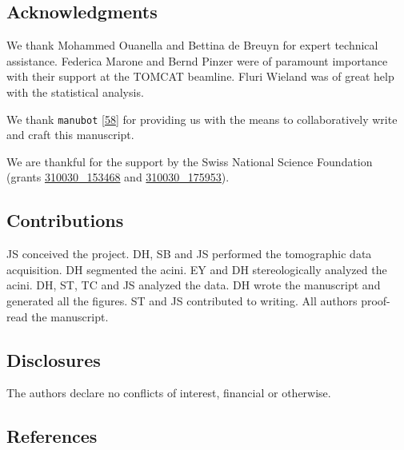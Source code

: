 \documentclass[
  american,
]{article}
\begin{document}
\hypertarget{acknowledgments}{%
\subsection{Acknowledgments}\label{acknowledgments}}

We thank Mohammed Ouanella and Bettina de Breuyn for expert technical assistance.
Federica Marone and Bernd Pinzer were of paramount importance with their support at the TOMCAT beamline.
Fluri Wieland was of great help with the statistical analysis.

We thank \texttt{manubot} {[}\protect\hyperlink{ref-YuJbg3zO}{58}{]} for providing us with the means to collaboratively write and craft this manuscript.

We are thankful for the support by the Swiss National Science Foundation (grants \href{http://p3.snf.ch/project-153468}{310030\_153468} and \href{http://p3.snf.ch/project-175953}{310030\_175953}).

\hypertarget{contributions}{%
\subsection{Contributions}\label{contributions}}

JS conceived the project.
DH, SB and JS performed the tomographic data acquisition.
DH segmented the acini.
EY and DH stereologically analyzed the acini.
DH, ST, TC and JS analyzed the data.
DH wrote the manuscript and generated all the figures.
ST and JS contributed to writing.
All authors proof-read the manuscript.

\hypertarget{disclosures}{%
\subsection{Disclosures}\label{disclosures}}

The authors declare no conﬂicts of interest, financial or otherwise.

\hypertarget{references}{%
\subsection{References}\label{references}}
\end{document}
